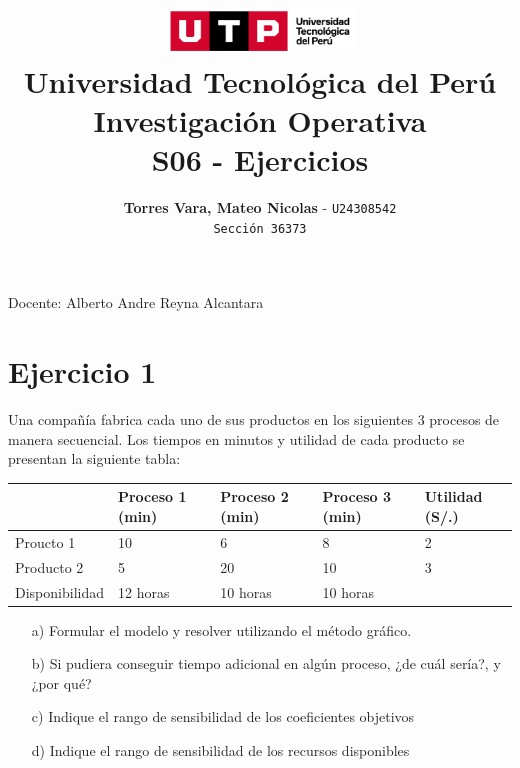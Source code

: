 \documentclass[12pt]{article}
\title{
  \vspace{2cm}
  \pagenumbering{gobble}
  \includegraphics[width=5cm]{../assets/logo-utp.png} \\
  \vspace{1cm}
  \textbf{Universidad Tecnológica del Perú} \\
  \vspace{2cm}
  \textbf{Investigación Operativa} \\
  \vspace{1cm}
  \large \textbf{S06 - Ejercicios}
}
\author{
  \textbf{Torres Vara, Mateo Nicolas} - \texttt{U24308542} \\
  \texttt{Sección 36373}
}
\begin{document}
\maketitle
\begin{center}

  Docente: Alberto Andre Reyna Alcantara

\end{center}

%
%

\newpage
{}
\section*{Ejercicio 1}
\noindent Una compañía fabrica cada uno de sus productos en los siguientes 3 procesos de manera
secuencial. Los tiempos en minutos y utilidad de cada producto se presentan la siguiente tabla: \\

\begin{center}
\begin{tabular}{|l|l|l|l|l|}
  \hline
  & Proceso 1 (min) & Proceso 2 (min) & Proceso 3 (min) & Utilidad (S/.) \\
  \hline
  Proucto 1 & 10 & 6 & 8 & 2 \\
  Producto 2 & 5 & 20 & 10 & 3 \\
  \hline
  Disponibilidad & 12 horas & 10 horas & 10 horas & \\
  \hline
\end{tabular}
\end{center}

\begin{itemize}
  \item[a)] Formular el modelo y resolver utilizando el método gráfico.
  \item[b)] Si pudiera conseguir tiempo adicional en algún proceso, ¿de cuál sería?, y ¿por qué?
  \item[c)] Indique el rango de sensibilidad de los coeficientes objetivos
  \item[d)] Indique el rango de sensibilidad de los recursos disponibles
\end{itemize}
\end{document}
